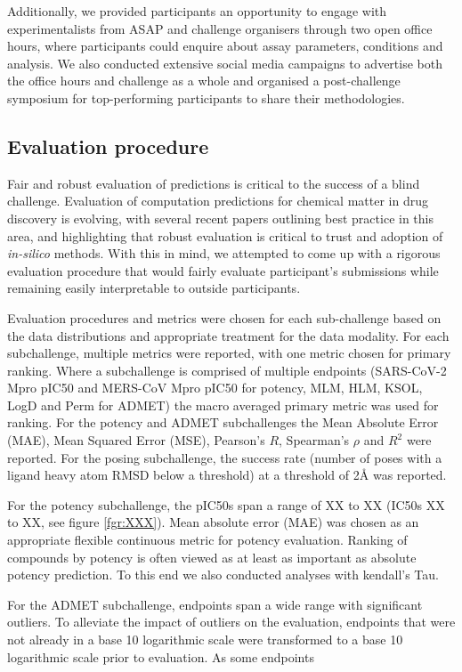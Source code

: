 \documentclass[journal=jacsat,manuscript=article]{achemso}
\begin{document}
Additionally, we provided participants an opportunity to engage with experimentalists from ASAP and challenge organisers through two open office hours, where participants could enquire about assay parameters, conditions and analysis. We also conducted extensive social media campaigns to advertise both the office hours and challenge as a whole and organised a post-challenge symposium for top-performing participants to share their methodologies. 


\subsection{Evaluation procedure}    

Fair and robust evaluation of predictions is critical to the success of a blind challenge. Evaluation of computation predictions for chemical matter in drug discovery is evolving, with several recent papers outlining best practice in this area, and highlighting that robust evaluation is critical to trust and adoption of \textit{in-silico} methods. With this in mind, we attempted to come up with a rigorous evaluation procedure that would fairly evaluate participant's submissions while remaining easily interpretable to outside participants.

Evaluation procedures and metrics were chosen for each sub-challenge based on the data distributions and appropriate treatment for the data modality. For each subchallenge, multiple metrics were reported, with one metric chosen for primary ranking. Where a subchallenge is comprised of multiple endpoints (SARS-CoV-2 Mpro pIC50 and MERS-CoV Mpro pIC50 for potency, MLM, HLM, KSOL, LogD and Perm for ADMET) the macro averaged primary metric was used for ranking. For the potency and ADMET subchallenges the Mean Absolute Error (MAE), Mean Squared Error (MSE), Pearson's $R$, Spearman's $\rho$ and $R^2$ were reported. For the posing subchallenge, the success rate (number of poses with a ligand heavy atom RMSD below a threshold) at a threshold of 2Å was reported.

For the potency subchallenge, the pIC50s span a range of XX to XX (IC50s XX to XX, see figure \ref{fgr:XXX}). Mean absolute error (MAE) was chosen as an appropriate flexible continuous metric for potency evaluation. Ranking of compounds by potency is often viewed as at least as important as absolute potency prediction. To this end we also conducted analyses  with kendall's Tau.

For the ADMET subchallenge, endpoints span a wide range with significant outliers. To alleviate the impact of outliers on the evaluation, endpoints that were not already in a base 10 logarithmic scale were transformed to a base 10 logarithmic scale prior to evaluation. As some endpoints 
\end{document}
